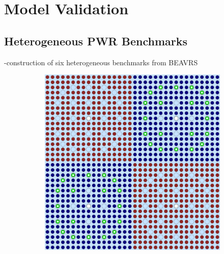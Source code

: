\documentclass[12pt,twoside]{mitthesis-exec}
\begin{document}
\clearpage

\section*{Model Validation}

\subsection*{Heterogeneous PWR Benchmarks}

-construction of six heterogeneous benchmarks from BEAVRS~\cite{horelik2013beavrs} \\

\begin{figure}[h!]
\centering
\begin{subfigure}{0.47\textwidth}
  \centering
  \includegraphics[width=0.9\linewidth]{figures/benchmarks/2x2}
  \caption{}
  \label{fig:2x2}
\end{subfigure}%
\begin{subfigure}{0.47\textwidth}
  \centering

\end{subfigure}
\end{figure}
\end{document}
